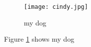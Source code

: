 \documentclass{article}
\begin{document}
	\begin{figure}
		\texttt{[image: cindy.jpg]}
		\caption{my dog}
		\label{fig:cindy}
	\end{figure}
    Figure \ref{fig:cindy} shows my dog
    
    
\end{document}
